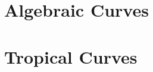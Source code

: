 \documentclass{article}
\begin{document}
	\section{Algebraic Curves}
	\section{Tropical Curves}
\end{document}
